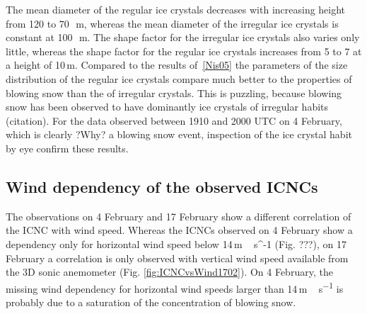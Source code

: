 \documentclass[draft,linenumbers]{agujournal}
\begin{document}
The mean diameter of the regular ice crystals decreases with increasing height from 120 to 70\,\si{\mu m}, whereas the mean diameter of the irregular ice crystals is constant at 100\,\si{\mu m}. The shape factor for the irregular ice crystals also varies only little, whereas the shape factor for the regular ice crystals increases from 5 to 7 at a height of 10\,\si{m}.
 Compared to the results of \,\ref{Nis05} the parameters of the size distribution of the regular ice crystals compare much better to the properties of blowing snow than the of irregular crystals. 
This is puzzling, because blowing snow has been observed to have dominantly ice crystals of irregular habits (citation). For the data observed between 1910 and 2000 UTC on 4 February, which is clearly ?Why? a blowing snow event, inspection of the ice crystal habit by eye confirm these results. 


\subsection{Wind dependency of the observed ICNCs}

The observations on 4 February and 17 February show a different correlation of the ICNC with wind speed. Whereas the ICNCs observed on 4 February show a dependency only for horizontal wind speed below 14\,\si{m\,{s^{-1}}} (Fig. ???), on 17 February a correlation is only observed with vertical wind speed available from the 3D sonic anemometer (Fig. \ref{fig:ICNCvsWind1702}). On 4 February, the missing wind dependency for horizontal wind speeds larger than 14\,\si{m\,s^{-1}} is probably due to a saturation of the concentration of blowing snow.
\end{document}
